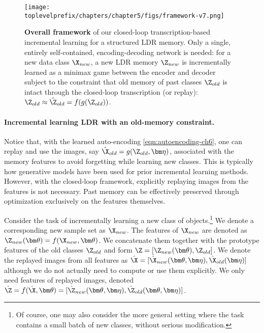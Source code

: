 \documentclass[../../book-main.tex]{subfiles}
\begin{document}
\begin{figure*}[t]
\centering
\texttt{[image: \\toplevelprefix/chapters/chapter5/figs/framework-v7.png]}
\caption{\textbf{Overall framework} of our closed-loop transcription-based incremental learning for a structured LDR memory. Only a single, entirely self-contained, encoding-decoding network is needed:  for a new data class $\X_{new}$, a new LDR memory $\Z_{new}$ is incrementally learned as a minimax game between the encoder and decoder subject to the constraint that old memory of past classes $\Z_{old}$ is intact through the closed-loop transcription (or replay): $\Z_{old} \approx \hat{\Z}_{ old} = f(g(\Z_{ old}))$.
\vspace{-0.2in}}
\label{fig:framework}
\end{figure*}

\paragraph{Incremental learning LDR with an old-memory constraint.} 
Notice that, with the learned auto-encoding \eqref{eqn:autoencoding-ch6}, one can replay and use the images, say $\hat\X_{old} = g(\Z_{old}, \bm \eta)$, associated with the memory features  to avoid forgetting while learning new classes. This is typically how generative models have been used for prior incremental learning methods. However, with the closed-loop framework, explicitly replaying images from the features is not necessary. Past memory can be effectively preserved through optimization exclusively on the features themselves.

Consider the task of incrementally learning a new class of objects.\footnote{Of course, one may also consider the more general setting where the task contains a small batch of new classes, without serious modification.} We denote a corresponding new sample set as $\X_{new}$. The features of $\X_{new}$ are denoted as  $\Z_{new}(\bm \theta) = f(\X_{new}, \bm \theta)$. We concatenate them together with the prototype features of the old classes $\Z_{old}$ and form $\Z = [\Z_{new}(\bm \theta), \Z_{old}]$. We denote the replayed images from all features as $\hat{\X} = [{\hat{\X}_{new}(\bm \theta,\bm \eta)}, {\hat{\X}_{old}(\bm \eta)}]$ although we do not actually need to compute or use them explicitly. We only need features of replayed images, denoted $\hat{\Z} = f(\hat{\X}, \bm \theta) =  [{\hat{\Z}_{new}(\bm \theta,\bm \eta)}, {\hat{\Z}_{old}(\bm \theta,\bm \eta)}]$. 
\end{document}

